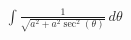 \documentclass[preview]{standalone}
\begin{document}
\begin{align*}
\int \frac{1}{\sqrt{a^2+a^2 \sec^2(\theta)}} \, d\theta
\end{align*}
\end{document}
